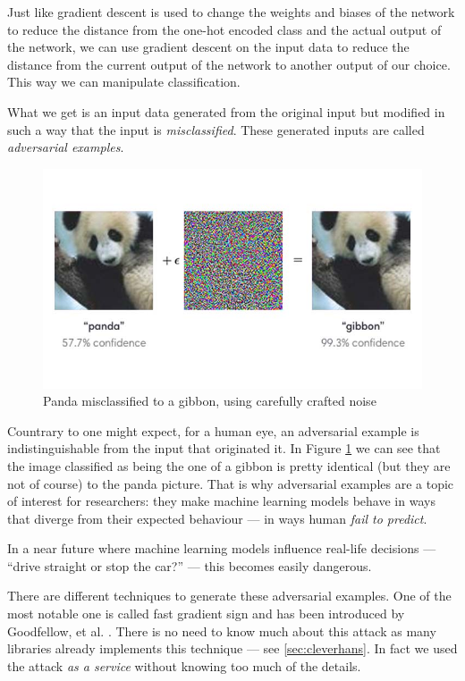 Just like gradient descent is used to change the weights and biases of
the network to reduce the distance from the one-hot encoded class and
the actual output of the network, we can use gradient descent on the
input data to reduce the distance from the current output of the network to
another output of our choice. This way we can manipulate classification.

What we get is an input data generated from the original input but
modified in such a way that the input is \emph{misclassified}. These
generated inputs are called \emph{adversarial examples}.

\begin{figure}
  \centering
  \includegraphics[width=0.5\linewidth]{Images/panda-gibbon.jpg}
  \caption{Panda misclassified to a gibbon, using carefully crafted
    noise}
  \label{fig:panda-gibbon}
\end{figure}

Countrary to one might expect, for a human eye, an adversarial example
is indistinguishable from the input that originated it. In Figure
\ref{fig:panda-gibbon} we can see that the image classified as being
the one of a gibbon is pretty identical (but they are not of course) to
the panda picture. That is why adversarial examples are a topic of
interest for researchers: they make machine learning models behave in
ways that diverge from their expected behaviour --- in ways human
\emph{fail to predict}.

In a near future where machine learning models influence real-life
decisions --- ``drive straight or stop the car?'' --- this becomes
easily dangerous.

There are different techniques to generate these adversarial examples.
One of the most notable one is called fast gradient sign and has been
introduced by Goodfellow, et al. \cite{goodfellow6572explaining}.
There is no need to know much about this attack as many libraries
already implements this technique --- see \ref{sec:cleverhans}. In fact
we used the attack \emph{as a service} without knowing too much of the
details.
